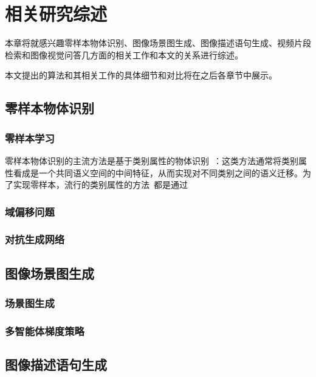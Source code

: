 \chapter{相关研究综述}

本章将就感兴趣零样本物体识别、图像场景图生成、图像描述语句生成、视频片段检索和图像视觉问答几方面的相关工作和本文的关系进行综述。

本文提出的算法和其相关工作的具体细节和对比将在之后各章节中展示。


\section{零样本物体识别}

\subsection{零样本学习}
零样本物体识别的主流方法是基于类别属性的物体识别~\cite{farhadi2009describing,lampert2009learning,romera2015embarrassingly,norouzi2014zero,demirel2017attributes2classname,jiang2017learning}：这类方法通常将类别属性看成是一个共同语义空间的中间特征，从而实现对不同类别之间的语义迁移。为了实现零样本，流行的类别属性的方法~\cite{frome2013devise,}都是通过


\subsection{域偏移问题}

\subsection{对抗生成网络}




\section{图像场景图生成}

\subsection{场景图生成}
 

\subsection{多智能体梯度策略}






\section{图像描述语句生成}


